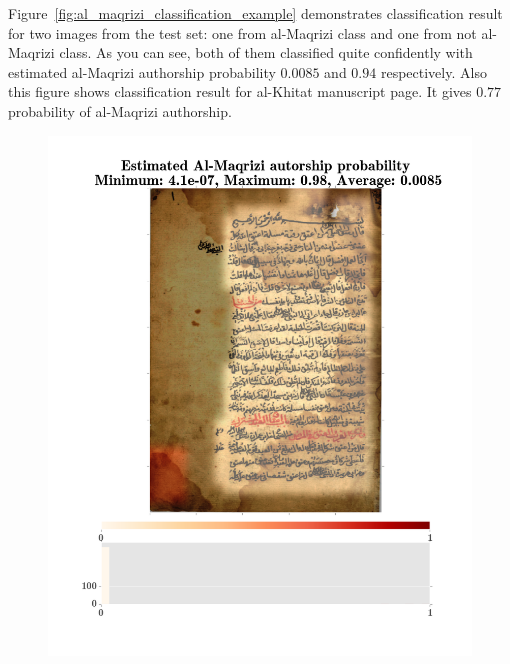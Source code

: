 \documentclass[conference,a4paper,twocolumn]{IEEEtran}
\begin{document}
Figure~\ref{fig:al_maqrizi_classification_example} demonstrates classification result for two images from the test set: one from al-Maqrizi class and one from not al-Maqrizi class. As you can see, both of them classified quite confidently with estimated al-Maqrizi authorship probability $0.0085$ and $0.94$ respectively. Also this figure shows classification result for al-Khitat manuscript page. It gives $0.77$ probability of al-Maqrizi authorship.

\begin{figure}
\centering
\begin{minipage}{.48\linewidth}
	\centering
  \includegraphics[width=\linewidth]{figures/not_al_maqrizi_image_classification_example.png}
\end{minipage}
\hspace{.01\linewidth}
\begin{minipage}{.48\linewidth}
	\centering

\end{minipage}
\end{figure}
\end{document}
